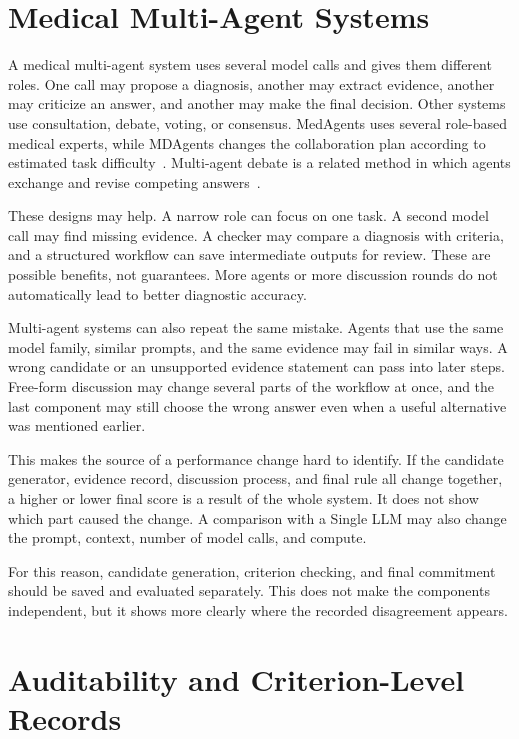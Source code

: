 \section{Medical Multi-Agent Systems}

A medical multi-agent system uses several model calls and gives them different roles. One call may propose a diagnosis, another may extract evidence, another may criticize an answer, and another may make the final decision. Other systems use consultation, debate, voting, or consensus. MedAgents uses several role-based medical experts, while MDAgents changes the collaboration plan according to estimated task difficulty~\citep{tang2024medagents,kim2024mdagents}. Multi-agent debate is a related method in which agents exchange and revise competing answers~\citep{du2024debate}.

These designs may help. A narrow role can focus on one task. A second model call may find missing evidence. A checker may compare a diagnosis with criteria, and a structured workflow can save intermediate outputs for review. These are possible benefits, not guarantees. More agents or more discussion rounds do not automatically lead to better diagnostic accuracy.

Multi-agent systems can also repeat the same mistake. Agents that use the same model family, similar prompts, and the same evidence may fail in similar ways. A wrong candidate or an unsupported evidence statement can pass into later steps. Free-form discussion may change several parts of the workflow at once, and the last component may still choose the wrong answer even when a useful alternative was mentioned earlier.

This makes the source of a performance change hard to identify. If the candidate generator, evidence record, discussion process, and final rule all change together, a higher or lower final score is a result of the whole system. It does not show which part caused the change. A comparison with a Single LLM may also change the prompt, context, number of model calls, and compute.

For this reason, candidate generation, criterion checking, and final commitment should be saved and evaluated separately. This does not make the components independent, but it shows more clearly where the recorded disagreement appears.

\section{Auditability and Criterion-Level Records}
\label{sec:auditability-definition}

